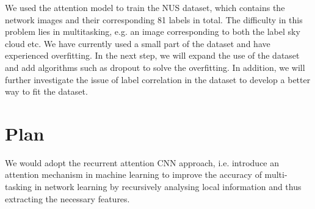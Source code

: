 \documentclass{article}
\begin{document}
We used the attention model to train the NUS dataset, which contains the network images and their corresponding 81 labels in total. The difficulty in this problem lies in multitasking, e.g. an image corresponding to both the label sky cloud etc. We have currently used a small part of the dataset and have experienced overfitting. In the next step, we will expand the use of the dataset and add algorithms such as dropout to solve the overfitting. In addition, we will further investigate the issue of label correlation in the dataset to develop a better way to fit the dataset.


\section{Plan}
We would adopt the recurrent attention CNN approach\cite{fu2017look}, i.e. introduce an attention mechanism in machine learning to improve the accuracy of multi-tasking in network learning by recursively analysing local information and thus extracting the necessary features.
\label{sec:plan}




 


\begin{appendix}

\end{appendix}


\end{document}
